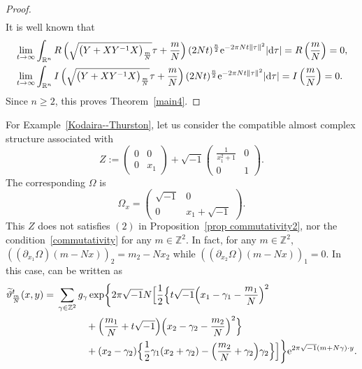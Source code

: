 \documentclass[10pt,a4paper]{amsart}
\numberwithin{equation}{section}
\newcommand{\R}{\mathbb{R}}
\newcommand{\Z}{\mathbb{Z}}
\renewcommand{\tilde}{\widetilde}
\newcommand{\abs}[1]{\lvert#1\rvert}
\newcommand{\norm}[1]{\lVert#1\rVert}
\begin{document}
\begin{proof}
\begin{gather*}
\end{gather*}
It is well known that
\begin{align*}
& \lim_{t\to \infty}\int_{\R^n} R\left(\sqrt{\bigl(Y+XY^{-1}X\bigr)_{\frac{m}{N}}}\tau +\frac{m}{N}\right)(2Nt)^\frac{n}{2} {\rm e}^{-2\pi Nt\norm{\tau}^2}\abs{{\rm d}\tau}=R\left(\frac{m}{N}\right)=0, \\
& \lim_{t\to \infty} \int_{\R^n} I\left(\sqrt{\bigl(Y+XY^{-1}X\bigr)_{\frac{m}{N}}}\tau +\frac{m}{N}\right)(2Nt)^\frac{n}{2} {\rm e}^{-2\pi Nt\norm{\tau}^2}\abs{{\rm d}\tau}=I\left(\frac{m}{N}\right)=0.
\end{align*}
Since $n\ge 2$, this proves Theorem~\ref{main4}.
\end{proof}

\begin{Example}%
For Example~\ref{Kodaira--Thurston}, let us consider the compatible almost complex structure associated with
\[
Z:=
\begin{pmatrix}
0 & 0 \\
0 & x_1
\end{pmatrix}
+\sqrt{-1}
\begin{pmatrix}
\frac{1}{x_1^2+1} & 0 \\
0 & 1
\end{pmatrix}.
\]
The corresponding $\Omega$ is
\begin{equation*}
\Omega_x=
\begin{pmatrix}
\sqrt{-1} & 0 \\
0 & x_1+\sqrt{-1}
\end{pmatrix}.
\end{equation*}
This $Z$ does not satisfies $(2)$ in Proposition~\ref{prop commutativity2}, nor
the condition~\eqref{commutativity} for any $m\in \Z^2$. In fact, for any $m\in \Z^2$, $((\partial_{x_1}\Omega)(m-Nx))_2=m_2-Nx_2$ while $((\partial_{x_2}\Omega)(m-Nx))_1=0$. In this case, \smash{${\tilde \vartheta}_{\frac{m}{N}}^t$} can be written as
\begin{align*}
{\tilde \vartheta}_{\frac{m}{N}}^t(x,y)={}&\sum_{\gamma \in \Z^2}g_\gamma \exp\biggl\{2\pi\sqrt{-1}N\Bigl[\frac{1}{2}\Bigl\{t\sqrt{-1}\Bigl(x_1-\gamma_1-\frac{m_1}{N}\Bigl)^2\\
& \hphantom{\sum_{\gamma \in \Z^2}g_\gamma}{}
+\Bigl(\frac{m_1}{N}+t\sqrt{-1}\Bigr)\Bigl(x_2-\gamma_2-\frac{m_2}{N}\Bigr)^2\Bigr\}\\
& \hphantom{\sum_{\gamma \in \Z^2}g_\gamma}{} +(x_2-\gamma_2)\Bigl\{ \frac{1}{2}\gamma_1(x_2+\gamma_2)-\Bigl( \frac{m_2}{N}+\gamma_2\Bigr)\gamma_2\Bigr\}\Bigr]\biggr\}{\rm e}^{2\pi\sqrt{-1}(m+N\gamma)\cdot y}.
\end{align*}
\end{Example}
\end{document}

